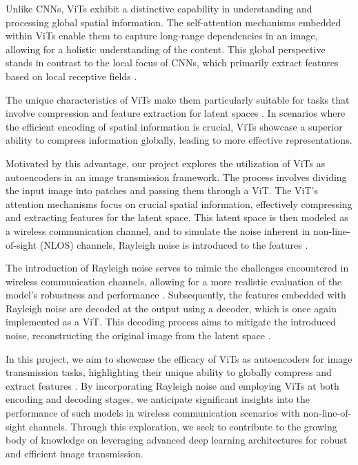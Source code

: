 \documentclass[10pt,twocolumn]{IEEEtran}
\begin{document}
Unlike CNNs, ViTs exhibit a distinctive capability in understanding and processing global spatial information. The self-attention mechanisms embedded within ViTs enable them to capture long-range dependencies in an image, allowing for a holistic understanding of the content. This global perspective stands in contrast to the local focus of CNNs, which primarily extract features based on local receptive fields \cite{letizia2021capacity}.

The unique characteristics of ViTs make them particularly suitable for tasks that involve compression and feature extraction for latent spaces \cite{chandar2021communication}. In scenarios where the efficient encoding of spatial information is crucial, ViTs showcase a superior ability to compress information globally, leading to more effective representations.

Motivated by this advantage, our project explores the utilization of ViTs as autoencoders in an image transmission framework. The process involves dividing the input image into patches and passing them through a ViT. The ViT's attention mechanisms focus on crucial spatial information, effectively compressing and extracting features for the latent space. This latent space is then modeled as a wireless communication channel, and to simulate the noise inherent in non-line-of-sight (NLOS) channels, Rayleigh noise is introduced to the features \cite{perera2018ship}.

The introduction of Rayleigh noise serves to mimic the challenges encountered in wireless communication channels, allowing for a more realistic evaluation of the model's robustness and performance \cite{zebang2019densely}. Subsequently, the features embedded with Rayleigh noise are decoded at the output using a decoder, which is once again implemented as a ViT. This decoding process aims to mitigate the introduced noise, reconstructing the original image from the latent space \cite{letizia2020capacity}.

In this project, we aim to showcase the efficacy of ViTs as autoencoders for image transmission tasks, highlighting their unique ability to globally compress and extract features \cite{zhang2019optimally}. By incorporating Rayleigh noise and employing ViTs at both encoding and decoding stages, we anticipate significant insights into the performance of such models in wireless communication scenarios with non-line-of-sight channels. Through this exploration, we seek to contribute to the growing body of knowledge on leveraging advanced deep learning architectures for robust and efficient image transmission.
\end{document}

